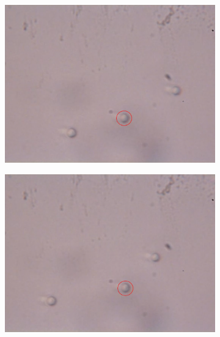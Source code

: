 \documentclass[letterpaper,12pt,oneside]{book}
\begin{document}
\begin{figure}[H]
\begin{subfigure}[b]{0.5\linewidth}
    \label{} 
    \vspace{4ex}
  \end{subfigure}%
  \begin{subfigure}[b]{0.5\linewidth}
    \centering
    \includegraphics[scale=0.22]{427particles/2.png} 
    \caption{}
    \label{fig7:b} 
    \vspace{4ex}
  \end{subfigure} 
  \begin{subfigure}[b]{0.5\linewidth}
    \centering
    \includegraphics[scale=0.22]{427particles/i.png} 
    \caption{}
    \label{fig7:c} 
  \end{subfigure}%
  \begin{subfigure}[b]{0.5\linewidth}

\end{subfigure}
\end{figure}
\end{document}
